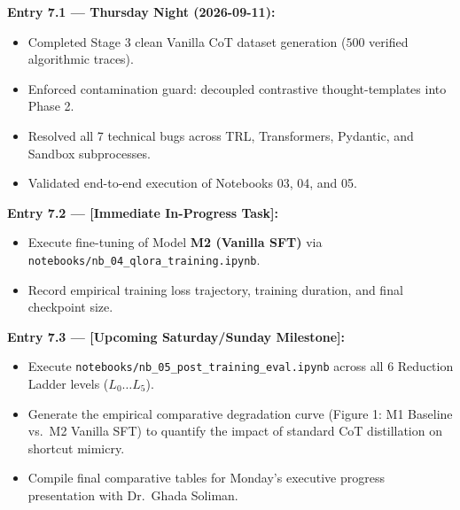 \documentclass[12pt, a4paper]{article}
\begin{document}
\begin{keybox}[title={\faClock\ Living Update Log (Append Entries)}]
\textbf{Entry 7.1 --- Thursday Night (2026-09-11):}
\begin{itemize}[leftmargin=*]
  \item Completed Stage 3 clean Vanilla CoT dataset generation ($500$ verified algorithmic traces).
  \item Enforced contamination guard: decoupled contrastive thought-templates into Phase 2.
  \item Resolved all 7 technical bugs across TRL, Transformers, Pydantic, and Sandbox subprocesses.
  \item Validated end-to-end execution of Notebooks 03, 04, and 05.
\end{itemize}

\textbf{Entry 7.2 --- [Immediate In-Progress Task]:}
\begin{itemize}[leftmargin=*]
  \item Execute fine-tuning of Model \textbf{M2 (Vanilla SFT)} via \texttt{notebooks/nb\_04\_qlora\_training.ipynb}.
  \item Record empirical training loss trajectory, training duration, and final checkpoint size.
\end{itemize}

\textbf{Entry 7.3 --- [Upcoming Saturday/Sunday Milestone]:}
\begin{itemize}[leftmargin=*]
  \item Execute \texttt{notebooks/nb\_05\_post\_training\_eval.ipynb} across all 6 Reduction Ladder levels ($L_0 \dots L_5$).
  \item Generate the empirical comparative degradation curve (Figure 1: M1 Baseline vs.\ M2 Vanilla SFT) to quantify the impact of standard CoT distillation on shortcut mimicry.
  \item Compile final comparative tables for Monday's executive progress presentation with Dr.~Ghada Soliman.
\end{itemize}
\end{keybox}

\newpage
\printbibliography[heading=bibintoc, title={References \& Cited Literature}]
\end{document}
